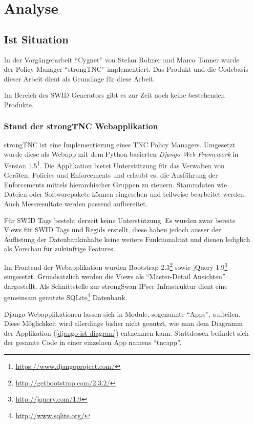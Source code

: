 \chapter{Analyse}

\section{Ist Situation}

In der Vorgängerarbeit \enquote{Cygnet} von Stefan Rohner und Marco
Tanner\cite{cygnet:2013} wurde der Policy Manager \enquote{strongTNC}
implementiert. Das Produkt und die Codebasis dieser Arbeit dient als Grundlage
für diese Arbeit.

Im Bereich des SWID Generators gibt es zur Zeit noch keine bestehenden Produkte.

\subsection{Stand der strongTNC Webapplikation} 

strongTNC ist eine Implementierung eines TNC Policy Managers. Umgesetzt wurde
diese als Webapp mit dem Python basierten \textit{Django Web Framework} in
Version 1.5\footnote{\url{https://www.djangoproject.com/}}. Die Applikation
bietet Unterstützung für das Verwalten von Geräten, Policies und Enforcements
und erlaubt es, die Ausführung der Enforcements mittels hierarchischer Gruppen
zu steuern. Stammdaten wie Dateien oder Softwarepakete können eingesehen und
teilweise bearbeitet werden. Auch Messresultate werden passend aufbereitet.

Für SWID Tags besteht derzeit keine Unterstützung. Es wurden zwar bereits Views
für SWID Tags und Regids erstellt, diese haben jedoch ausser der Auflistung der
Datenbankinhalte keine weitere Funktionalität und dienen lediglich als Vorschau
für zukünftige Features.

Im Frontend der Webapplikation wurden Bootstrap
2.3\footnote{\url{http://getbootstrap.com/2.3.2/}} sowie jQuery
1.9\footnote{\url{http://jquery.com/1.9}} eingesetzt. Grundsätzlich werden die
Views als \enquote{Master-Detail Ansichten} dargestellt. Als Schnittstelle zur
strongSwan IPsec Infrastruktur dient eine gemeinsam genutzte
SQLite\footnote{\url{http://www.sqlite.org/}} Datenbank.

Django Webapplikationen lassen sich in Module, sogenannte \enquote{Apps},
aufteilen. Diese Möglichkeit wird allerdings bisher nicht genutzt, wie man dem
Diagramm der Applikation (\autoref{django-ist-diagram}) entnehmen kann.
Stattdessen befindet sich der gesamte Code in einer einzelnen App namens
\enquote{tncapp}.

